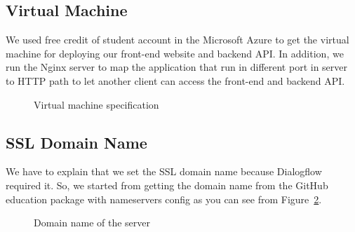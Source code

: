 \documentclass[12pt,oneside,openright,a4paper]{cpe-english-project}
\begin{document}
\subsection{Virtual Machine}
We used free credit of student account in the Microsoft Azure to get
the virtual machine for deploying our front-end website and backend API.
In addition, we run the Nginx server to map the application that run in
different port in server to HTTP path to let another client can access the
front-end and backend API.
\begin{figure}[!h]\centering
	\caption{Virtual machine specification}\label{fig:Virtual machine specification}
\end{figure}

\pagebreak
\subsection{SSL Domain Name}
We have to explain that we set the SSL domain name because Dialogflow required it.
So, we started from getting the domain name from the GitHub education package with
nameservers config as you can see from Figure~\ref*{fig:Domain name of the server}.

\begin{figure}[!h]\centering
	\caption{Domain name of the server}\label{fig:Domain name of the server}
\end{figure}
\end{document}
